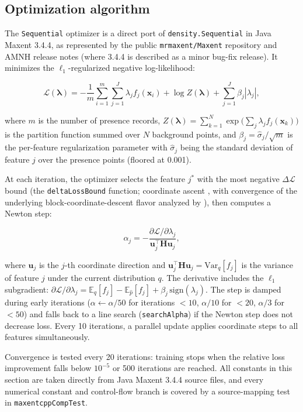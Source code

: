 \documentclass[10pt,letterpaper]{article}
\begin{document}
\subsection*{Optimization algorithm}

The \texttt{Sequential} optimizer is a direct port of
\texttt{density.Sequential} in Java Maxent 3.4.4, as represented by the
public \texttt{mrmaxent/Maxent} repository and AMNH release notes (where
3.4.4 is described as a minor bug-fix release). It minimizes the
\(\ell_1\)-regularized negative log-likelihood:

\[
\mathcal{L}(\boldsymbol{\lambda}) = -\frac{1}{m}\sum_{i=1}^{m}
\sum_{j=1}^{J} \lambda_j f_j(\mathbf{x}_i) + \log Z(\boldsymbol{\lambda})
+ \sum_{j=1}^{J} \beta_j |\lambda_j|,
\]

where \(m\) is the number of presence records, \(Z(\boldsymbol{\lambda})
= \sum_{k=1}^{N} \exp\!\bigl(\sum_j \lambda_j f_j(\mathbf{x}_k)\bigr)\)
is the partition function summed over \(N\) background points, and
\(\beta_j = \hat\sigma_j / \sqrt{m}\) is the per-feature regularization
parameter with \(\hat\sigma_j\) being the standard deviation of feature
\(j\) over the presence points (floored at 0.001).

At each iteration, the optimizer selects the feature \(j^*\) with the
most negative \(\Delta\mathcal{L}\) bound (the \texttt{deltaLossBound}
function; coordinate ascent \cite{Phillips2006}, with convergence of
the underlying block-coordinate-descent flavor analyzed by
\cite{Tseng2001}), then computes a Newton step:

\[
\alpha_j = -\frac{\partial \mathcal{L}/\partial \lambda_j}
{\mathbf{u}_j^\top \mathbf{H} \mathbf{u}_j},
\]

where \(\mathbf{u}_j\) is the \(j\)-th coordinate direction and
\(\mathbf{u}_j^\top \mathbf{H} \mathbf{u}_j = \mathrm{Var}_q[f_j]\) is
the variance of feature \(j\) under the current distribution \(q\). The
derivative includes the \(\ell_1\) subgradient:
\(\partial \mathcal{L}/\partial \lambda_j = \mathbb{E}_q[f_j] -
\mathbb{E}_{\hat p}[f_j] + \beta_j \,\mathrm{sign}(\lambda_j)\). The
step is damped during early iterations (\(\alpha \leftarrow \alpha/50\)
for iterations \(<10\), \(\alpha/10\) for \(<20\), \(\alpha/3\) for
\(<50\)) and falls back to a line search (\texttt{searchAlpha}) if the
Newton step does not decrease loss. Every 10 iterations, a parallel
update applies coordinate steps to all features simultaneously.

Convergence is tested every 20 iterations: training stops when the
relative loss improvement falls below \(10^{-5}\) or 500 iterations are
reached. All constants in this section are taken directly from Java
Maxent 3.4.4 source files, and every numerical constant and control-flow
branch is covered by a source-mapping test in
\texttt{maxentcppCompTest}.
\end{document}
